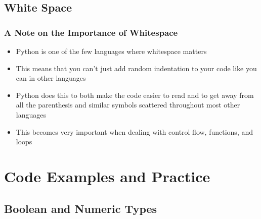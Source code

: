 \documentclass[mini frame in current subsection]{beamer}
\begin{document}
	\subsection{White Space}
	
		\begin{frame}
			\frametitle{A Note on the Importance of Whitespace}
			\begin{itemize}
				\vfill \item  Python is one of the few languages where whitespace matters
				\vfill \item  This means that you can't just add random indentation to your code like you can in other languages
				\vfill \item  Python does this to both make the code easier to read and to get away from all the parenthesis and similar symbols scattered throughout most other languages
				\vfill\item  This becomes very important when dealing with control flow, functions, and loops
			\end{itemize}
		\end{frame}

\section{Code Examples and Practice}

	\subsection{Boolean and Numeric Types}
	
\end{document}
